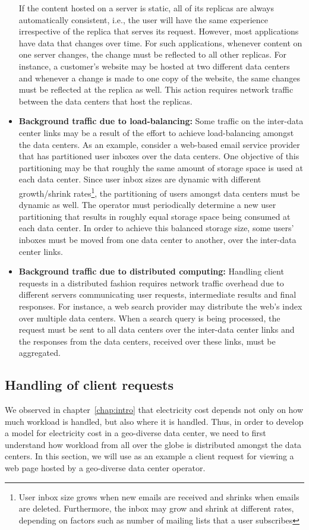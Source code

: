 \begin{itemize}
If the content hosted on a server is static, all of its replicas are always automatically consistent, i.e., the user will have the same experience irrespective of the replica that serves its request. However, most applications have data that changes over time. For such applications, whenever content on one server changes, the change must be reflected to all other replicas. For instance, a customer's website may be hosted at two different data centers and whenever a change is made to one copy of the website, the same changes must be reflected at the replica as well. This action requires network traffic between the data centers that host the replicas. 
\item \textbf{Background traffic due to load-balancing:} Some traffic on the inter-data center links may be a result of the effort to achieve load-balancing amongst the data centers. As an example, consider a web-based email service provider that has partitioned user inboxes over the data centers. One objective of this partitioning may be that roughly the same amount of storage space is used at each data center. Since user inbox sizes are dynamic with different growth/shrink rates\footnote{User inbox size grows when new emails are received and shrinks when emails are deleted. Furthermore, the inbox may grow and shrink at different rates, depending on factors such as number of mailing lists that a user subscribes}, the partitioning of users amongst data centers must be dynamic as well. The operator must periodically determine a new user partitioning that results in roughly equal storage space being consumed at each data center. In order to achieve this balanced storage size, some users' inboxes must be moved from one data center to another, over the inter-data center links.
\item \textbf{Background traffic due to distributed computing:} Handling client requests in a distributed fashion requires network traffic overhead due to different servers communicating user requests, intermediate results and final responses. For instance, a web search provider may distribute the web's index over multiple data centers. When a search query is being processed, the request must be sent to all data centers over the inter-data center links and the responses from the data centers, received over these links,  must be aggregated.
\end{itemize}

\subsection{Handling of client requests} 
We observed in chapter~\ref{chap:intro} that electricity cost depends not only on how much workload is handled, but also where it is handled. Thus, in order to develop a model for electricity cost in a geo-diverse data center, we need to first understand how workload from all over the globe is distributed amongst the data centers. In this section, we will use as an example a client request for viewing a web page hosted by a geo-diverse data center operator. 

